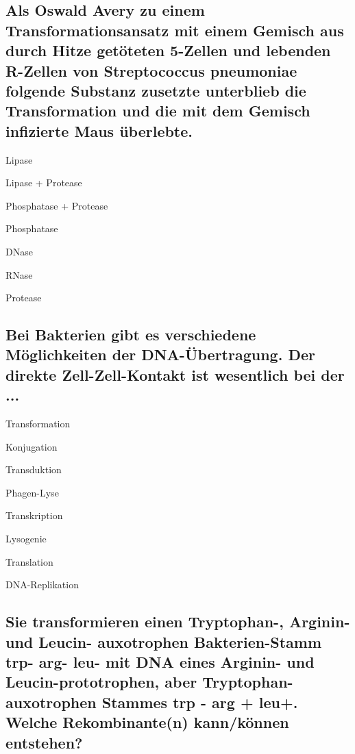 \documentclass{article}
\begin{document}
\subsection*{Als Oswald Avery zu einem Transformationsansatz mit einem Gemisch aus durch Hitze getöteten 5-Zellen und lebenden R-Zellen von Streptococcus pneumoniae folgende Substanz zusetzte unterblieb die Transformation und die mit dem Gemisch infizierte Maus überlebte.
}
\begin{todolist}
\item Lipase
\item Lipase + Protease 
\item Phosphatase + Protease
\item Phosphatase 
\item  DNase
\item RNase
\item Protease
\end{todolist}
\subsection*{Bei Bakterien gibt es verschiedene Möglichkeiten der DNA-Übertragung. Der direkte Zell-Zell-Kontakt ist wesentlich bei der ...}
\begin{todolist}
\item Transformation
\item  Konjugation
\item Transduktion
\item Phagen-Lyse 
\item Transkription
\item Lysogenie
\item Translation
\item DNA-Replikation
\end{todolist}
\subsection*{Sie transformieren einen Tryptophan-, Arginin- und Leucin- auxotrophen Bakterien-Stamm trp- arg- leu- mit DNA eines Arginin- und Leucin-prototrophen, aber Tryptophan-auxotrophen Stammes trp - arg + leu+. 
Welche Rekombinante(n) kann/können entstehen?}
\bigskip\bigskip\bigskip\bigskip
\end{document}
